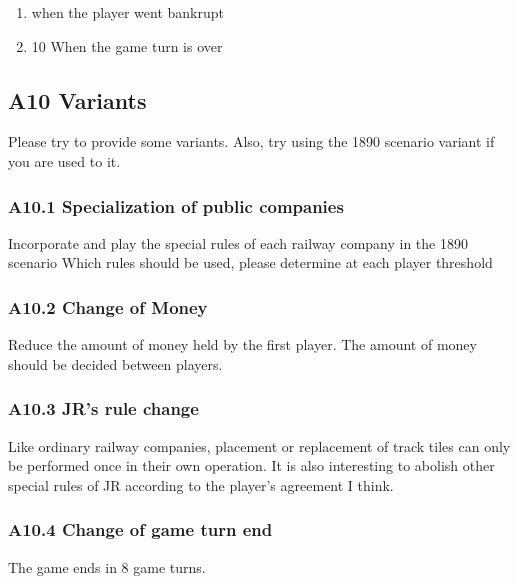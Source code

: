 \documentclass{article}
\begin{document}
\begin{CJK}{UTF8}{min}
\begin{enumerate}
\item when the player went bankrupt

\item 10 When the game turn is over
\end{enumerate}

\subsection*{A10 Variants}

Please try to provide some variants. Also, try using the 1890 scenario
variant if you are used to it.

\subsubsection*{A10.1 Specialization of public companies}

Incorporate and play the special rules of each railway company in the
1890 scenario Which rules should be used, please determine at each
player threshold

\subsubsection*{A10.2 Change of Money}

Reduce the amount of money held by the first player. The amount of
money should be decided between players.

\subsubsection*{A10.3 JR's rule change}

Like ordinary railway companies, placement or replacement of track
tiles can only be performed once in their own operation. It is also
interesting to abolish other special rules of JR according to the
player's agreement I think.

\subsubsection*{A10.4 Change of game turn end}

The game ends in 8 game turns.





\end{CJK}
\end{document}
